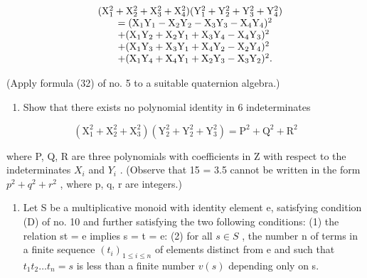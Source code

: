 \[
\begin{array}{r l} & (\mathrm{X} _ {1} ^ {2} + \mathrm{X} _ {2} ^ {2} + \mathrm{X} _ {3} ^ {2} + \mathrm{X} _ {4} ^ {2}) (\mathrm{Y} _ {1} ^ {2} + \mathrm{Y} _ {2} ^ {2} + \mathrm{Y} _ {3} ^ {2} + \mathrm{Y} _ {4} ^ {2}) \\ & \qquad = (\mathrm{X} _ {1} \mathrm{Y} _ {1} - \mathrm{X} _ {2} \mathrm{Y} _ {2} - \mathrm{X} _ {3} \mathrm{Y} _ {3} - \mathrm{X} _ {4} \mathrm{Y} _ {4}) ^ {2} \\ & \qquad + (\mathrm{X} _ {1} \mathrm{Y} _ {2} + \mathrm{X} _ {2} \mathrm{Y} _ {1} + \mathrm{X} _ {3} \mathrm{Y} _ {4} - \mathrm{X} _ {4} \mathrm{Y} _ {3}) ^ {2} \\ & \qquad + (\mathrm{X} _ {1} \mathrm{Y} _ {3} + \mathrm{X} _ {3} \mathrm{Y} _ {1} + \mathrm{X} _ {4} \mathrm{Y} _ {2} - \mathrm{X} _ {2} \mathrm{Y} _ {4}) ^ {2} \\ & \qquad + (\mathrm{X} _ {1} \mathrm{Y} _ {4} + \mathrm{X} _ {4} \mathrm{Y} _ {1} + \mathrm{X} _ {2} \mathrm{Y} _ {3} - \mathrm{X} _ {3} \mathrm{Y} _ {2}) ^ {2}. \end{array}
\]

(Apply formula (32) of no. 5 to a suitable quaternion algebra.)

\begin{enumerate}
\def\labelenumi{\arabic{enumi}.}
\setcounter{enumi}{19}
\tightlist
\item
  Show that there exists no polynomial identity in 6 indeterminates
\end{enumerate}

\[
(\mathrm{X} _ {1} ^ {2} + \mathrm{X} _ {2} ^ {2} + \mathrm{X} _ {3} ^ {2}) (\mathrm{Y} _ {2} ^ {2} + \mathrm{Y} _ {2} ^ {2} + \mathrm{Y} _ {3} ^ {2}) = \mathrm{P} ^ {2} + \mathrm{Q} ^ {2} + \mathrm{R} ^ {2}
\]

where P, Q, R are three polynomials with coefficients in Z with respect to the indeterminates \(X_{i}\) and \(Y_{i}\) . (Observe that 15 = 3.5 cannot be written in the form \(p^{2} + q^{2} + r^{2}\) , where p, q, r are integers.)

\begin{enumerate}
\def\labelenumi{\arabic{enumi}.}
\setcounter{enumi}{20}
\tightlist
\item
  Let S be a multiplicative monoid with identity element e, satisfying condition (D) of no. 10 and further satisfying the two following conditions: (1) the relation st = e implies s = t = e: (2) for all \(s \in S\) , the number n of terms in a finite sequence \((t_{i})_{1 \leq i \leq n}\) of elements distinct from e and such that \(t_{1}t_{2} \ldots t_{n} = s\) is less than a finite number \(v(s)\) depending only on s.
\end{enumerate}

